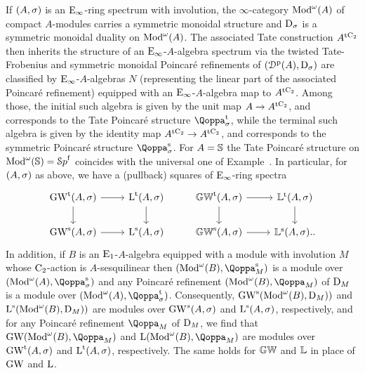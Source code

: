 \begin{example}
\label{example:initial-terminal}%
If $(A,\sigma)$ is an ${\mathrm{E}_{\infty}}$-ring spectrum with involution, the $\infty$-category $\operatorname{Mod}^{\omega}({A})$ of compact $A$-modules carries a symmetric monoidal structure and $\mathrm{D}_{\sigma}$ is a symmetric monoidal duality on $\operatorname{Mod}^{\omega}({A})$. The associated Tate construction $A^{{\mathrm{t}\mathrm{C_2}}}$ then inherits the structure of an ${\mathrm{E}_{\infty}}$-$A$-algebra spectrum via the twisted Tate-Frobenius and symmetric monoidal Poincaré refinements of $({\mathcal D}^{\mathrm{p}}(A),\mathrm{D}_{\sigma})$ are classified by ${\mathrm{E}_{\infty}}$-$A$-algebras $N$ (representing the linear part of the associated Poincaré refinement) equipped with an ${\mathrm{E}_{\infty}}$-$A$-algebra map to $A^{{\mathrm{t}\mathrm{C_2}}}$. Among those, the initial such algebra is given by the unit map $A \to A^{{\mathrm{t}\mathrm{C_2}}}$, and corresponds to the Tate Poincaré structure $\QF^{\tate}_{\sig}$, while the terminal such algebra is given by the identity map $A^{{\mathrm{t}\mathrm{C_2}}} \to A^{{\mathrm{t}\mathrm{C_2}}}$, and corresponds to the symmetric Poincaré structure $\QF^{\sym}_{\sig}$. For $A=\mathbb{S}$ the Tate Poincaré structure on $\operatorname{Mod}^{\omega}({\mathbb{S}}) = {\mathcal Sp}^{\mathrm{f}}$ coincides with the universal one of Example~.
In particular, for $(A,\sigma)$ as above, we have a (pullback) squares of ${\mathrm{E}_{\infty}}$-ring spectra 
\[
\begin{tikzcd}
\GW^{\tate}(A,\sig) \ar[r]\ar[d] & \L^{\tate}(A,\sig) \ar[d] &\KGW^{\tate}(A,\sig) \ar[r]\ar[d] & \KL^{\tate}(A,\sig) \ar[d] \\
\GW^{\sym}(A,\sig)\ar[r] & \L^{\sym}(A,\sig) & \KGW^{\sym}(A,\sig)\ar[r] & \KL^{\sym}(A,\sig)..
\end{tikzcd}
\]
In addition, if $B$ is an ${\mathrm{E}_{1}}$-$A$-algebra equipped with a module with involution $M$ whose $\mathrm{C_2}$-action is $A$-sesquilinear then $(\Modp{B},\QF^{\sym}_M)$ is a module over $(\Modp{A},\QF^{\sym}_{\sig})$ and any Poincaré refinement $(\Modp{B},\QF_M)$ of $\mathrm{D}_{M}$ is a module over $(\Modp{A},\QF^{\tate}_{\sig})$. Consequently, $\operatorname{GW}^{\mathrm{s}}(\operatorname{Mod}^{\omega}({B}),\mathrm{D}_M))$ and $\operatorname L^{\mathrm{s}}(\operatorname{Mod}^{\omega}({B}),\mathrm{D}_M))$ are modules over $\operatorname{GW}^s(A,\sigma)$ and $\operatorname L^{\mathrm{s}}(A,\sigma)$, respectively, and for any Poincar\'e refinement $\QF_M$ of $\mathrm{D}_M$, we find that $\GW(\Modp{B},\QF_M)$ and $\L(\Modp{B},\QF_M)$ are modules over $\operatorname{GW}^{\mathrm{t}}(A,\sigma)$ and $\operatorname L^{\mathrm{t}}(A,\sigma)$, respectively. The same holds for $\mathbb{GW}$ and $\mathbb{L}$ in place of $\operatorname{GW}$ and $\operatorname L$.
\end{example}


